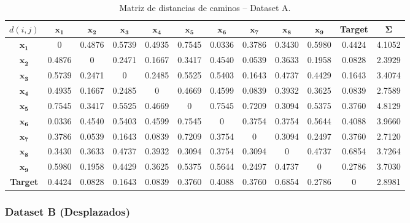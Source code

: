 \documentclass[12pt,a4paper]{article}
\begin{document}
\begin{table}[H]
    \centering
    \footnotesize
    \begin{tabular}{c|cccccccccc|c}
        \toprule
        $d(i,j)$ & $\mathbf{x_1}$ & $\mathbf{x_2}$ & $\mathbf{x_3}$ & $\mathbf{x_4}$ & $\mathbf{x_5}$ & $\mathbf{x_6}$ & $\mathbf{x_7}$ & $\mathbf{x_8}$ & $\mathbf{x_9}$ & \textbf{Target} & $\mathbf{\Sigma}$ \\
        \midrule
        $\mathbf{x_1}$   & 0 & 0.4876 & 0.5739 & 0.4935 & 0.7545 & 0.0336 & 0.3786 & 0.3430 & 0.5980 & 0.4424 & 4.1052 \\
        $\mathbf{x_2}$   & 0.4876 & 0 & 0.2471 & 0.1667 & 0.3417 & 0.4540 & 0.0539 & 0.3633 & 0.1958 & 0.0828 & 2.3929 \\
        $\mathbf{x_3}$   & 0.5739 & 0.2471 & 0 & 0.2485 & 0.5525 & 0.5403 & 0.1643 & 0.4737 & 0.4429 & 0.1643 & 3.4074 \\
        $\mathbf{x_4}$   & 0.4935 & 0.1667 & 0.2485 & 0 & 0.4669 & 0.4599 & 0.0839 & 0.3932 & 0.3625 & 0.0839 & 2.7589 \\
        $\mathbf{x_5}$   & 0.7545 & 0.3417 & 0.5525 & 0.4669 & 0 & 0.7545 & 0.7209 & 0.3094 & 0.5375 & 0.3760 & 4.8129 \\
        $\mathbf{x_6}$   & 0.0336 & 0.4540 & 0.5403 & 0.4599 & 0.7545 & 0 & 0.3754 & 0.3754 & 0.5644 & 0.4088 & 3.9660 \\
        $\mathbf{x_7}$   & 0.3786 & 0.0539 & 0.1643 & 0.0839 & 0.7209 & 0.3754 & 0 & 0.3094 & 0.2497 & 0.3760 & 2.7120 \\
        $\mathbf{x_8}$   & 0.3430 & 0.3633 & 0.4737 & 0.3932 & 0.3094 & 0.3754 & 0.3094 & 0 & 0.4737 & 0.6854 & 3.7264 \\
        $\mathbf{x_9}$   & 0.5980 & 0.1958 & 0.4429 & 0.3625 & 0.5375 & 0.5644 & 0.2497 & 0.4737 & 0 & 0.2786 & 3.7030 \\
        \textbf{Target}  & 0.4424 & 0.0828 & 0.1643 & 0.0839 & 0.3760 & 0.4088 & 0.3760 & 0.6854 & 0.2786 & 0 & 2.8981 \\
        \bottomrule
    \end{tabular}
    \caption{Matriz de distancias de caminos -- Dataset A.}
\end{table}

\subsubsection{Dataset B (Desplazados)}
\end{document}
